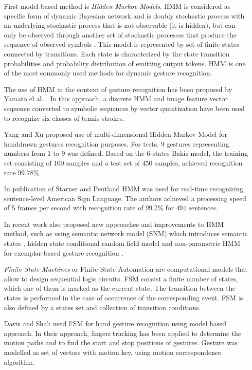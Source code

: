 First model-based method is \emph{Hidden Markov Models}. HMM is considered as specific form of dynamic Bayesian network and is doubly stochastic process with an underlying stochastic process that is not observable (it is hidden), but can only be observed through another set of stochastic processes that produce the sequence of observed symbols \cite{RabinerHmmIntro}. This model is represented by set of finite states connected by transitions. Each state is characterized by the state transition probabilities and probability distribution of emitting output tokens. HMM is one of the most commonly used methods for dynamic gesture recognition.

The use of HMM in the context of gesture recognition has been proposed by Yamato el al. \cite{YamatoComputerVision}. In this approach, a discrete HMM and image feature vector sequence converted to symbolic sequences by vector quantization have been used to recognize six classes of tennis strokes.

Yang and Xu \cite{Yang_1994_329} proposed use of multi-dimensional Hidden Markov Model for handdrawn gestures recognition purposes. For tests, $9$ gestures representing numbers from $1$ to $9$ was defined. Based on the $6$-states Bakis model, the training set consisting of $100$ samples and a test set of $450$ samples, achieved recognition rate $99.78\%$.

In publication of Starner and Pentland \cite{StarnerComputerVision} HMM was used for real-time recognizing sentence-level American Sign Language. The authors achieved a processing speed of 5 frames per second with recognition rate of $99.2\%$ for $494$ sentences.

In recent work also proposed new approaches and improvements to HMM method, such as using semantic network model (SNM) which introduces semantic states \cite{RajkoComputerVision}, hidden state conditional random field model \cite{WangComputerVision} and non-parametric HMM for exemplar-based gesture recognition \cite{Elgammal:2003:LDE:1965841.1965916}.

\emph{Finite State Machines} or Finite State Automation are computational models that allow to design sequential logic circuits. FSM consist a finite number of states, which one of them is marked as the current state. The transition between the states is performed in the case of occurrence of the corresponding event. FSM is also defined by a states set and collection of transition conditions.

Davis and Shah \cite{Davis94visualgesture} used FSM for hand gesture recognition using model based approach. In their approach, fingers tracking has been applied to determine the motion paths and to find the start and stop positions of gestures. Gesture was modelled as set of vectors with motion key, using motion correspondence algorithm.

